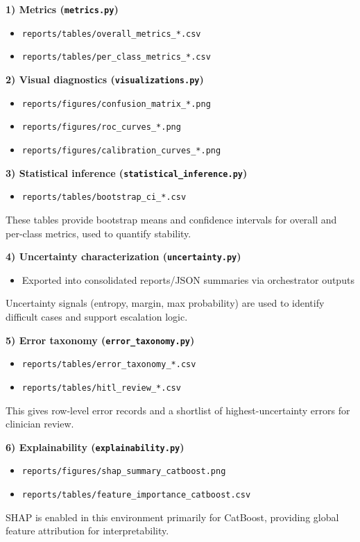 ﻿\documentclass[12pt]{article}
\begin{document}
\textbf{1) Metrics (\texttt{metrics.py})}
\begin{itemize}
    \item \texttt{reports/tables/overall\_metrics\_*.csv}
    \item \texttt{reports/tables/per\_class\_metrics\_*.csv}
\end{itemize}

\textbf{2) Visual diagnostics (\texttt{visualizations.py})}
\begin{itemize}
    \item \texttt{reports/figures/confusion\_matrix\_*.png}
    \item \texttt{reports/figures/roc\_curves\_*.png}
    \item \texttt{reports/figures/calibration\_curves\_*.png}
\end{itemize}

\textbf{3) Statistical inference (\texttt{statistical\_inference.py})}
\begin{itemize}
    \item \texttt{reports/tables/bootstrap\_ci\_*.csv}
\end{itemize}
These tables provide bootstrap means and confidence intervals for overall and per-class metrics, used to quantify stability.

\textbf{4) Uncertainty characterization (\texttt{uncertainty.py})}
\begin{itemize}
    \item Exported into consolidated reports/JSON summaries via orchestrator outputs
\end{itemize}
Uncertainty signals (entropy, margin, max probability) are used to identify difficult cases and support escalation logic.

\textbf{5) Error taxonomy (\texttt{error\_taxonomy.py})}
\begin{itemize}
    \item \texttt{reports/tables/error\_taxonomy\_*.csv}
    \item \texttt{reports/tables/hitl\_review\_*.csv}
\end{itemize}
This gives row-level error records and a shortlist of highest-uncertainty errors for clinician review.

\textbf{6) Explainability (\texttt{explainability.py})}
\begin{itemize}
    \item \texttt{reports/figures/shap\_summary\_catboost.png}
    \item \texttt{reports/tables/feature\_importance\_catboost.csv}
\end{itemize}
SHAP is enabled in this environment primarily for CatBoost, providing global feature attribution for interpretability.
\end{document}
